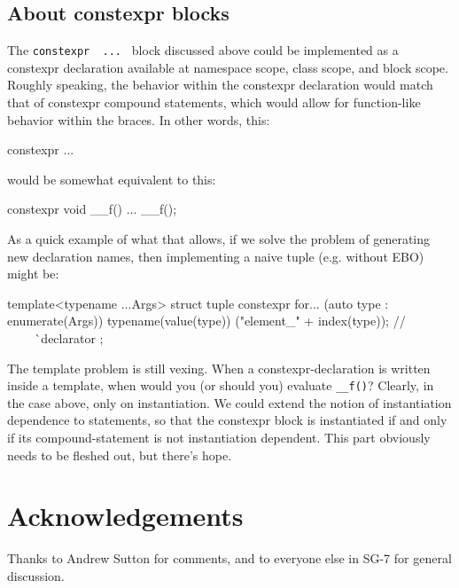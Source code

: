 \documentclass{wg21}
\newcommand{\cc}[1]{\texttt{#1}}
\begin{document}
\subsection{About constexpr blocks}
The \cc{constexpr { ... }} block discussed above could be implemented as a
constexpr declaration available at namespace scope, class scope, and block
scope. Roughly speaking, the behavior within the constexpr declaration would
match that of constexpr compound statements, which would allow for function-like
behavior within the braces. In other words, this:

\begin{cpp}
constexpr {
  ...
}
\end{cpp}

would be somewhat equivalent to this:

\begin{cpp}
constexpr void __f() { ... }
__f();
\end{cpp}

As a quick example of what that allows, if we solve the problem of generating
new declaration names, then implementing a naive tuple (e.g. without EBO)
might be:

\begin{cpp}
template<typename ...Args>
struct tuple {
  constexpr {
    for... (auto type : enumerate(Args))
      typename(value(type)) ("element_" + index(type));
      //                    ^^^^^^^^^^^^^^^^^^^^^^^^^^ declarator
  }
};
\end{cpp}

The template problem is still vexing. When a constexpr-declaration is written
inside a template, when would you (or should you) evaluate \cc{__f()}? Clearly,
in the case above, only on instantiation. We could extend the notion of
instantiation dependence to statements, so that the constexpr block is
instantiated if and only if its compound-statement is not instantiation
dependent. This part obviously needs to be fleshed out, but there's hope.


\section{Acknowledgements}
Thanks to Andrew Sutton for comments, and to everyone else in SG-7 for general
discussion.
\end{document}
